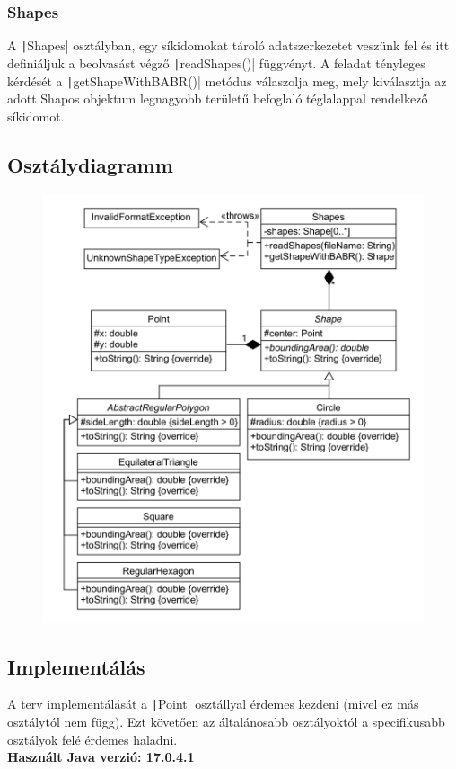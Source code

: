 \documentclass[12pt,a4paper]{article}
\theoremstyle{definition}
\begin{document}
	\subsubsection{Shapes}
	A \texttt|Shapes| osztályban, egy síkidomokat tároló adatszerkezetet veszünk fel és itt definiáljuk a beolvasást végző \texttt|readShapes()| függvényt. A feladat tényleges kérdését a \texttt|getShapeWithBABR()| metódus válaszolja meg, mely kiválasztja az adott Shapos objektum legnagyobb területű befoglaló téglalappal rendelkező  síkidomot.
	
	\subsection{Osztálydiagramm}
	\begin{figure}[H]
		\centering
		\includegraphics[scale=0.35]{classdiagram.png}
	\end{figure}
	\subsection{Implementálás}
	A terv implementálását a \texttt|Point| osztállyal érdemes kezdeni (mivel ez más osztálytól nem függ). Ezt követően az általánosabb osztályoktól a specifikusabb osztályok felé érdemes haladni.
	\\[4pt] 
	\textbf{Használt Java verzió: 17.0.4.1}
\end{document}
